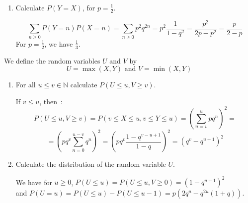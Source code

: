 \documentclass[a4paper,11pt]{exam}
\begin{document}
\begin{questions}
\begin{enumerate}
	\item Calculate $P(Y = X)$, for $p=\frac{1}{2}$.
	
	\begin{solution}
		\[
		\sum_{n \geq 0} P(Y=n) P(X=n)
		= \sum_{n \geq 0} p^2 q^{2n}
		= p^2 \frac{1}{1-q^2}
		= \frac{p^2}{2p-p^2}
		= \frac{p}{2-p}
		\]
		For $p=\frac{1}{2}$, we have $\frac{1}{3}$.
	\end{solution}
	
	
	

\end{enumerate}
We define the random variables $U$ and $V$ by
\[
U = \max(X,Y) \mbox{ and } V = \min(X,Y)
\]
\begin{enumerate}[resume]
	\item For all $u\leq v\in \mathbb N$ calculate $P(U\leq u,V\geq v)$.
	
	\begin{solution}
		If $v \leq u$, then~:
		\[
		P(U\leq u,V\geq v)
		= P( v \leq X \leq u, v\leq Y \leq u)
		=\left(\sum_{n=v}^{u}pq^n \right)^2 =
		\]
		\[
		=\left(pq^v\sum_{n=0}^{u-v}q^n \right)^2
		=\left(pq^v\frac{1-q^{v-u+1}}{1-q} \right)^2
		= (q^{v} -q^{u+1})^2
		\]
	\end{solution}
	
	\item Calculate the distribution of the random variable $U$.
	
	\begin{solution}
		We have for $u\geq 0$,
		$P(U\leq u ) = P(U\leq u , V \geq 0) = (1 -q^{u+1})^2$\\
		and $P(U=u) = P(U\leq u) - P(U \leq u-1) = p(2q^u-q^{2u}(1+q))$.
	\end{solution}
	
\end{enumerate}


\end{questions}
\end{document}
